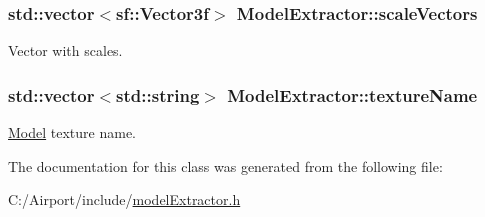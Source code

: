 \subsubsection[{\texorpdfstring{scale\+Vectors}{scaleVectors}}]{\setlength{\rightskip}{0pt plus 5cm}std\+::vector$<$sf\+::\+Vector3f$>$ Model\+Extractor\+::scale\+Vectors\hspace{0.3cm}{\ttfamily [private]}}\hypertarget{class_model_extractor_a03bcd2b8bcfffe704b07583ee597b65e}{}\label{class_model_extractor_a03bcd2b8bcfffe704b07583ee597b65e}
Vector with scales. 
\subsubsection[{\texorpdfstring{texture\+Name}{textureName}}]{\setlength{\rightskip}{0pt plus 5cm}std\+::vector$<$std\+::string$>$ Model\+Extractor\+::texture\+Name\hspace{0.3cm}{\ttfamily [private]}}\hypertarget{class_model_extractor_ab1c441c2915f84360bc00b331b301eb2}{}\label{class_model_extractor_ab1c441c2915f84360bc00b331b301eb2}
\hyperlink{class_model}{Model} texture name. 

The documentation for this class was generated from the following file\+:\begin{DoxyCompactItemize}
\item 
C\+:/\+Airport/include/\hyperlink{model_extractor_8h}{model\+Extractor.\+h}\end{DoxyCompactItemize}
